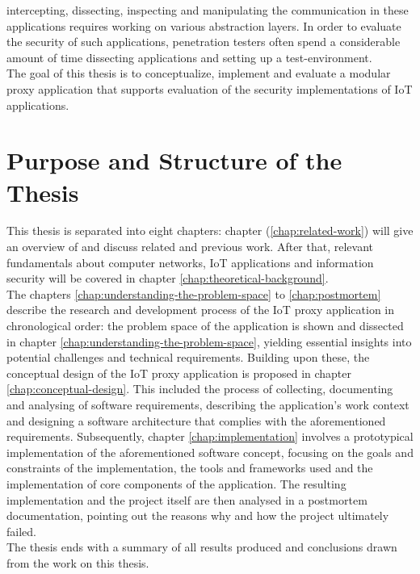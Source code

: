 intercepting, dissecting, inspecting and manipulating the communication in these applications requires working on various abstraction layers. In order to evaluate the security of such applications, penetration testers often spend a considerable amount of time dissecting applications and setting up a test-environment.\\
The goal of this thesis is to conceptualize, implement and evaluate a modular proxy application that supports evaluation of the security implementations of \ac{IoT} applications.%

\section{Purpose and Structure of the Thesis}
This thesis is separated into eight chapters: chapter (\ref{chap:related-work}) will give an overview of and discuss related and previous work. After that, relevant fundamentals about computer networks, \ac{IoT} applications and information security will be covered in chapter \ref{chap:theoretical-background}.\\
The chapters \ref{chap:understanding-the-problem-space} to \ref{chap:postmortem} describe the research and development process of the \ac{IoT} proxy application in chronological order: the problem space of the application is shown and dissected in chapter \ref{chap:understanding-the-problem-space}, yielding essential insights into potential challenges and technical requirements. Building upon these, the conceptual design of the \ac{IoT} proxy application is proposed in chapter \ref{chap:conceptual-design}. This included the process of collecting, documenting and analysing of software requirements, describing the application's work context and designing a software architecture that complies with the aforementioned requirements. Subsequently, chapter \ref{chap:implementation} involves a prototypical implementation of the aforementioned software concept, focusing on the goals and constraints of the implementation, the tools and frameworks used and the implementation of core components of the application. The resulting implementation and the project itself are then analysed in a postmortem documentation, pointing out the reasons why and how the project ultimately failed.\\
The thesis ends with a summary of all results produced and conclusions drawn from the work on this thesis.